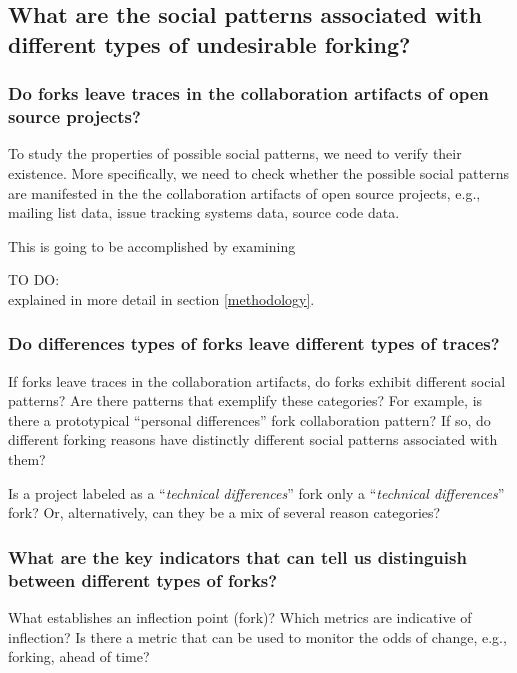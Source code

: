 \documentclass{acm_proc_article-sp}
\begin{document}
\subsection*{What are the social patterns associated with different types of undesirable forking?\\}

\subsubsection{Do forks leave traces in the collaboration artifacts of open source projects?\\}

To study the properties of possible social patterns, we need to verify their existence. More specifically, we need to check whether the possible social patterns are manifested in the the collaboration artifacts of open source projects, e.g., mailing list data, issue tracking systems data, source code data. 

This is going to be accomplished by examining 

TO DO:\\

explained in more detail in section \ref{methodology}.

\subsubsection{Do differences types of forks leave different types of traces?\\}

If forks leave traces in the collaboration artifacts, do forks exhibit different social patterns? Are there patterns that exemplify these categories? For example, is there a prototypical ``personal differences'' fork collaboration pattern? If so, do different forking reasons have distinctly different social patterns associated with them? 

Is a project labeled as a ``\textit{technical differences}'' fork only a ``\textit{technical differences}'' fork? Or, alternatively, can they be a mix of several reason categories?

\subsubsection{What are the key indicators that can tell us distinguish between different types of forks?\\}

What establishes an inflection point (fork)? Which metrics are indicative of inflection? Is there a metric that can be used to monitor the odds of change, e.g., forking, ahead of time?
\end{document}
